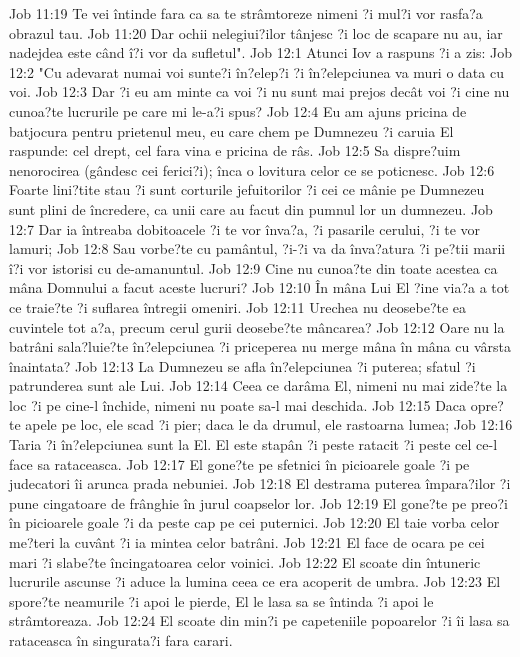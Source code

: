 Job 11:19  Te vei întinde fara ca sa te strâmtoreze nimeni ?i mul?i vor rasfa?a obrazul tau.
Job 11:20  Dar ochii nelegiui?ilor tânjesc ?i loc de scapare nu au, iar nadejdea este când î?i vor da sufletul".
Job 12:1  Atunci Iov a raspuns ?i a zis:
Job 12:2  "Cu adevarat numai voi sunte?i în?elep?i ?i în?elepciunea va muri o data cu voi.
Job 12:3  Dar ?i eu am minte ca voi ?i nu sunt mai prejos decât voi ?i cine nu cunoa?te lucrurile pe care mi le-a?i spus?
Job 12:4  Eu am ajuns pricina de batjocura pentru prietenul meu, eu care chem pe Dumnezeu ?i caruia El raspunde: cel drept, cel fara vina e pricina de râs.
Job 12:5  Sa dispre?uim nenorocirea (gândesc cei ferici?i); înca o lovitura celor ce se poticnesc.
Job 12:6  Foarte lini?tite stau ?i sunt corturile jefuitorilor ?i cei ce mânie pe Dumnezeu sunt plini de încredere, ca unii care au facut din pumnul lor un dumnezeu.
Job 12:7  Dar ia întreaba dobitoacele ?i te vor înva?a, ?i pasarile cerului, ?i te vor lamuri;
Job 12:8  Sau vorbe?te cu pamântul, ?i-?i va da înva?atura ?i pe?tii marii î?i vor istorisi cu de-amanuntul.
Job 12:9  Cine nu cunoa?te din toate acestea ca mâna Domnului a facut aceste lucruri?
Job 12:10  În mâna Lui El ?ine via?a a tot ce traie?te ?i suflarea întregii omeniri.
Job 12:11  Urechea nu deosebe?te ea cuvintele tot a?a, precum cerul gurii deosebe?te mâncarea?
Job 12:12  Oare nu la batrâni sala?luie?te în?elepciunea ?i priceperea nu merge mâna în mâna cu vârsta înaintata?
Job 12:13  La Dumnezeu se afla în?elepciunea ?i puterea; sfatul ?i patrunderea sunt ale Lui.
Job 12:14  Ceea ce darâma El, nimeni nu mai zide?te la loc ?i pe cine-l închide, nimeni nu poate sa-l mai deschida.
Job 12:15  Daca opre?te apele pe loc, ele scad ?i pier; daca le da drumul, ele rastoarna lumea;
Job 12:16  Taria ?i în?elepciunea sunt la El. El este stapân ?i peste ratacit ?i peste cel ce-l face sa rataceasca.
Job 12:17  El gone?te pe sfetnici în picioarele goale ?i pe judecatori îi arunca prada nebuniei.
Job 12:18  El destrama puterea împara?ilor ?i pune cingatoare de frânghie în jurul coapselor lor.
Job 12:19  El gone?te pe preo?i în picioarele goale ?i da peste cap pe cei puternici.
Job 12:20  El taie vorba celor me?teri la cuvânt ?i ia mintea celor batrâni.
Job 12:21  El face de ocara pe cei mari ?i slabe?te încingatoarea celor voinici.
Job 12:22  El scoate din întuneric lucrurile ascunse ?i aduce la lumina ceea ce era acoperit de umbra.
Job 12:23  El spore?te neamurile ?i apoi le pierde, El le lasa sa se întinda ?i apoi le strâmtoreaza.
Job 12:24  El scoate din min?i pe capeteniile popoarelor ?i îi lasa sa rataceasca în singurata?i fara carari.
